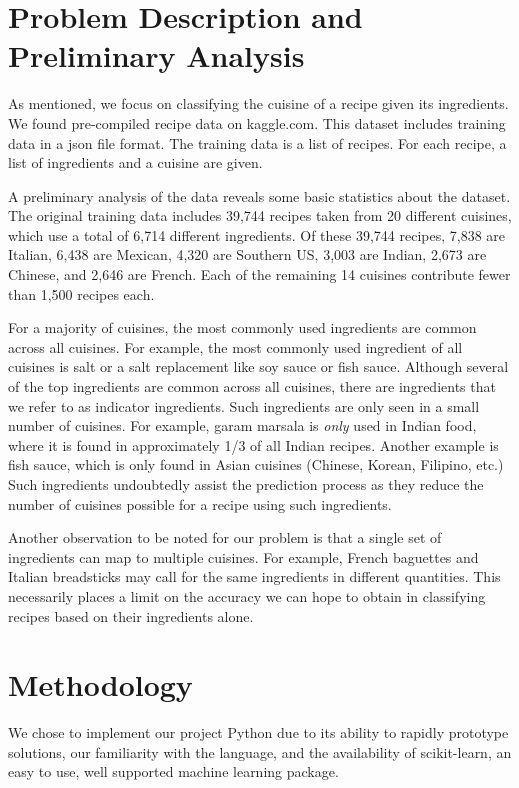 \documentclass[11pt]{article}
\begin{document}
\section{Problem Description and Preliminary Analysis}
As mentioned, we focus on classifying the cuisine of a recipe given
its ingredients.  We found pre-compiled recipe data on kaggle.com.
This dataset includes training data in a json file format.  The
training data is a list of recipes.  For each recipe, a list of
ingredients and a cuisine are given.  

A preliminary analysis of the data reveals some basic statistics about
the dataset.  The original training data includes 39,744 recipes taken
from 20 different cuisines, which use a total of 6,714 different
ingredients.  Of these 39,744 recipes, 7,838 are Italian, 6,438 are
Mexican, 4,320 are Southern US, 3,003 are Indian, 2,673 are Chinese,
and 2,646 are French.  Each of the remaining 14 cuisines contribute
fewer than 1,500 recipes each.

For a majority of cuisines, the most commonly used ingredients are
common across all cuisines.  For example, the most commonly used
ingredient of all cuisines is salt or a salt replacement like soy
sauce or fish sauce.  Although several of the top ingredients are
common across all cuisines, there are ingredients that we refer to as
indicator ingredients.  Such ingredients are only seen in a small
number of cuisines.  For example, garam marsala is \emph{only} used in
Indian food, where it is found in approximately 1/3 of all Indian
recipes.  Another example is fish sauce, which is only found in Asian
cuisines (Chinese, Korean, Filipino, etc.) Such ingredients
undoubtedly assist the prediction process as they reduce 
the number of cuisines possible for a recipe using such ingredients.  

Another observation to be noted for our problem is that a single set of
ingredients can map to multiple cuisines.  For example, French
baguettes and Italian breadsticks may call for the same ingredients in
different quantities.  This necessarily places a limit on the accuracy
we can hope to obtain in classifying recipes based on their
ingredients alone.


\section{Methodology}
We chose to implement our project Python due to its ability to rapidly
prototype solutions, our familiarity with the language, and the
availability of scikit-learn, an easy to use, well supported machine
learning package.  
\end{document}
